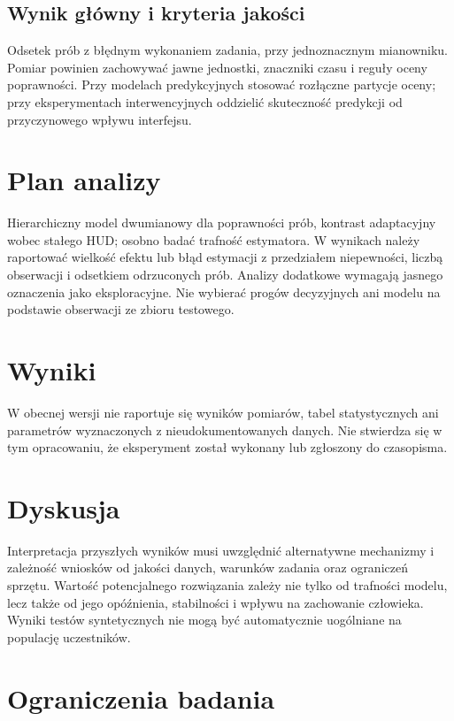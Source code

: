\documentclass[11pt,a4paper]{article}
\begin{document}
\subsection{Wynik główny i kryteria jakości}

Odsetek prób z błędnym wykonaniem zadania, przy jednoznacznym mianowniku. Pomiar powinien zachowywać jawne jednostki, znaczniki czasu i reguły oceny poprawności. Przy modelach predykcyjnych stosować rozłączne partycje oceny; przy eksperymentach interwencyjnych oddzielić skuteczność predykcji od przyczynowego wpływu interfejsu.

\section{Plan analizy}

Hierarchiczny model dwumianowy dla poprawności prób, kontrast adaptacyjny wobec stałego HUD; osobno badać trafność estymatora. W wynikach należy raportować wielkość efektu lub błąd estymacji z przedziałem niepewności, liczbą obserwacji i odsetkiem odrzuconych prób. Analizy dodatkowe wymagają jasnego oznaczenia jako eksploracyjne. Nie wybierać progów decyzyjnych ani modelu na podstawie obserwacji ze zbioru testowego.

\section{Wyniki}

W obecnej wersji nie raportuje się wyników pomiarów, tabel statystycznych ani parametrów wyznaczonych z nieudokumentowanych danych. Nie stwierdza się w tym opracowaniu, że eksperyment został wykonany lub zgłoszony do czasopisma.

\section{Dyskusja}

Interpretacja przyszłych wyników musi uwzględnić alternatywne mechanizmy i zależność wniosków od jakości danych, warunków zadania oraz ograniczeń sprzętu. Wartość potencjalnego rozwiązania zależy nie tylko od trafności modelu, lecz także od jego opóźnienia, stabilności i wpływu na zachowanie człowieka. Wyniki testów syntetycznych nie mogą być automatycznie uogólniane na populację uczestników.

\section{Ograniczenia badania}
\end{document}
